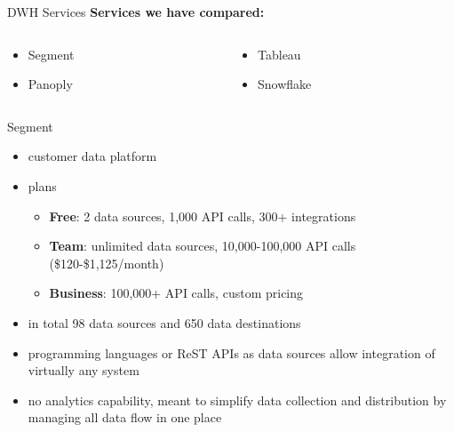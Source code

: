 \documentclass[aspectratio=169]{beamer}
\begin{document}
  \begin{frame}{DWH Services}
    \textbf{Services we have compared:}

    \begin{columns}
      \begin{column}{0.5\textwidth}
        \begin{itemize}
          \item Segment
          \item Panoply
        \end{itemize}
      \end{column}

      \begin{column}{0.5\textwidth}
        \begin{itemize}
          \item Tableau
          \item Snowflake
        \end{itemize}
      \end{column}
    \end{columns}
  \end{frame}

  \begin{frame}{Segment}
		\begin{itemize}
      \item customer data platform
      \item plans
		  \begin{itemize}
        \item \textbf{Free}: 2 data sources, 1,000 API calls, 300+ integrations
        \item \textbf{Team}: unlimited data sources, 10,000-100,000 API calls (\$120-\$1,125/month)
        \item \textbf{Business}: 100,000+ API calls, custom pricing
      \end{itemize}
      \item in total 98 data sources and 650 data destinations
      \item programming languages or ReST APIs as data sources allow integration of virtually any system
      \item no analytics capability, meant to simplify data collection and distribution by managing all data flow in one place
    \end{itemize}
  \end{frame}
\end{document}
